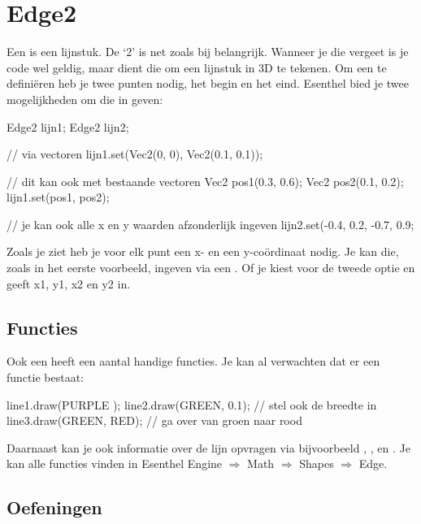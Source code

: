 \section{Edge2}
Een  is een lijnstuk. De `2' is net zoals bij  belangrijk. Wanneer je die vergeet is je code wel geldig, maar dient die om een lijnstuk in 3D te tekenen. Om een  te defini\"eren heb je twee punten nodig, het begin en het eind. Esenthel bied je twee mogelijkheden om die in geven:

\begin{code}
Edge2 lijn1;
Edge2 lijn2;

// via vectoren
lijn1.set(Vec2(0, 0), Vec2(0.1, 0.1));

// dit kan ook met bestaande vectoren
Vec2 pos1(0.3, 0.6);
Vec2 pos2(0.1, 0.2);
lijn1.set(pos1, pos2);

// je kan ook alle x en y waarden afzonderlijk ingeven
lijn2.set(-0.4, 0.2, -0.7, 0.9;
\end{code}

Zoals je ziet heb je voor elk punt een x- en een y-co\"ordinaat nodig. Je kan die, zoals in het eerste voorbeeld, ingeven via een . Of je kiest voor de tweede optie en geeft x1, y1, x2 en y2 in.

\subsection{Functies}
Ook een  heeft een aantal handige functies. Je kan al verwachten dat er een functie  bestaat:

\begin{code}
line1.draw(PURPLE    );
line2.draw(GREEN, 0.1); // stel ook de breedte in
line3.draw(GREEN, RED); // ga over van groen naar rood
\end{code}

Daarnaast kan je ook informatie over de lijn opvragen via bijvoorbeeld , ,  en . Je kan alle functies vinden in Esenthel Engine $\Rightarrow$ Math $\Rightarrow$ Shapes $\Rightarrow$ Edge.

\subsection{Oefeningen}

